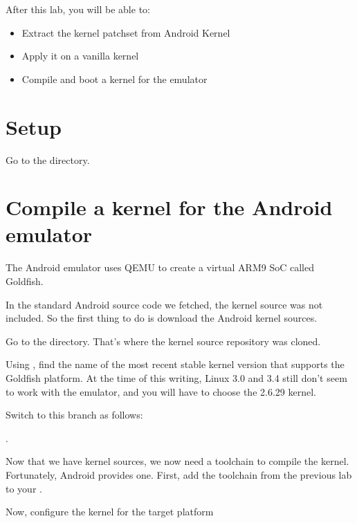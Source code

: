 
After this lab, you will be able to:
\begin{itemize}
  \item Extract the kernel patchset from Android Kernel
  \item Apply it on a vanilla kernel
  \item Compile and boot a kernel for the emulator
\end{itemize}

\section{Setup}

Go to the  directory.

\section{Compile a kernel for the Android emulator}

The Android emulator uses QEMU to create a virtual ARM9 SoC called
Goldfish.

In the standard Android source code we fetched, the kernel source was
not included.  So the first thing to do is download the Android kernel
sources.


Go to the  directory. That's where the kernel source
repository was cloned.

Using , find the name of the most recent stable
kernel version that supports the Goldfish platform. At the time of
this writing, Linux 3.0 and 3.4 still don't seem to work with the
emulator, and you will have to choose the 2.6.29 kernel.

Switch to this branch as follows:

.

Now that we have kernel sources, we now need a toolchain to compile
the kernel. Fortunately, Android provides one. First, add the
toolchain from the previous lab to your .


Now, configure the kernel for the target platform

